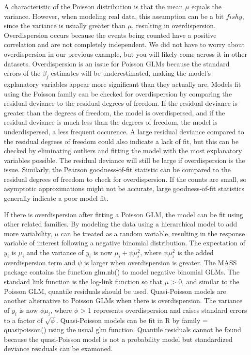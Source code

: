 \documentclass[
]{book}
\begin{document}
A characteristic of the Poisson distribution is that the mean \(\mu\) equals the variance. However, when modeling real data, this assumption can be a bit \({fishy}\), since the variance is usually greater than \(\mu\), resulting in overdispersion. Overdispersion occurs because the events being counted have a positive correlation and are not completely independent. We did not have to worry about overdispersion in our previous example, but you will likely come across it in other datasets. Overdispersion is an issue for Poisson GLMs because the standard errors of the \(\beta_j\) estimates will be underestimated, making the model's explanatory variables appear more significant than they actually are. Models fit using the Poisson family can be checked for overdispersion by comparing the residual deviance to the residual degrees of freedom. If the residual deviance is greater than the degrees of freedom, the model is overdispersed, and if the residual deviance is much less than the degrees of freedom, the model is underdispersed, a less frequent occurence. A large residual deviance compared to the residual degrees of freedom could also indicate a lack of fit, but this can be checked by eliminating outliers and fitting the model with the most explanatory variables possible. The residual deviance will still be large if overdispersion is the issue. Similarly, the Pearson goodness-of-fit statistic can be compared to the residual degrees of freedom to check for overdispersion. If the counts are small, so asymptotic approximations might not be accurate, large goodness-of-fit statistics generally indicate a poor model fit.

If there is overdispersion after fitting a Poisson GLM, the model can be fit using other related families. By modeling the data using a hierarchical model to add more variability, \(\mu\) can be treated as a random variable, resulting in the response variable of interest following a negative binomial distribution. The expectation of \(y_i\) is \(\mu_i\) and the variance of \(y_i\) is now \(\mu_i + \psi\mu_i^2\), where \(\psi\mu_i^2\) is the added overdispersion term and \(\psi\) is larger when overdispersion is greater. The MASS package contains the function glm.nb() to model negative binomial GLMs. The standard link function is the log-link function so that \(\mu\) \textgreater{} 0, and similar to the Poisson GLM, quantile residuals should be used. Quasi-Poisson models are another alternative to Poisson GLMs when there is overdispersion. The variance of \(y_i\) is now \(\phi\mu_i\), where \(\phi\) \textgreater{} 1 represents overdispersion and raises standard errors to a factor of \(\sqrt{\phi}\). Quasi-Poisson models can be fit in R by family = quasipoisson() using the usual glm function. Quantile residuals cannot be found because the quasi-Poisson model is not a probability model but standardized deviance residuals can be examoned.

  
\end{document}
